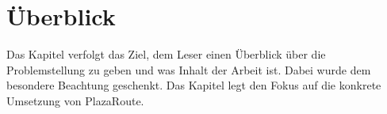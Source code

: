 \section{Überblick}
\label{sec:Überblick}
Das Kapitel  verfolgt das Ziel, dem Leser einen Überblick über die Problemstellung zu geben und was Inhalt der Arbeit ist. Dabei wurde dem  besondere Beachtung geschenkt. Das Kapitel  legt den Fokus auf die konkrete Umsetzung von PlazaRoute.